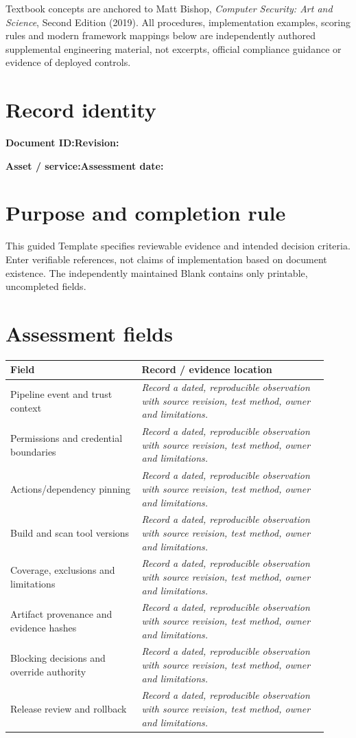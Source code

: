 \documentclass[10pt,letterpaper]{article}
\begin{document}
\makedoctocpage
\begin{notebox}
Textbook concepts are anchored to Matt Bishop, \emph{Computer Security: Art and Science}, Second Edition (2019). All procedures, implementation examples, scoring rules and modern framework mappings below are independently authored supplemental engineering material, not excerpts, official compliance guidance or evidence of deployed controls.
\end{notebox}
\section{Record identity}
\textbf{Document ID:}\enspace\hrulefill\quad\textbf{Revision:}\enspace\hrulefill
\par\medskip\textbf{Asset / service:}\enspace\hrulefill\quad\textbf{Assessment date:}\enspace\hrulefill
\section{Purpose and completion rule}
This guided Template specifies reviewable evidence and intended decision criteria. Enter verifiable references, not claims of implementation based on document existence. The independently maintained Blank contains only printable, uncompleted fields.
\section{Assessment fields}
\renewcommand{\arraystretch}{1.8}
\begin{longtable}{@{}p{0.38\linewidth}p{0.54\linewidth}@{}}
\toprule\textbf{Field}&\textbf{Record / evidence location}\\\midrule\endhead
Pipeline event and trust context & \emph{Record a dated, reproducible observation with source revision, test method, owner and limitations.}\\\midrule
Permissions and credential boundaries & \emph{Record a dated, reproducible observation with source revision, test method, owner and limitations.}\\\midrule
Actions/dependency pinning & \emph{Record a dated, reproducible observation with source revision, test method, owner and limitations.}\\\midrule
Build and scan tool versions & \emph{Record a dated, reproducible observation with source revision, test method, owner and limitations.}\\\midrule
Coverage, exclusions and limitations & \emph{Record a dated, reproducible observation with source revision, test method, owner and limitations.}\\\midrule
Artifact provenance and evidence hashes & \emph{Record a dated, reproducible observation with source revision, test method, owner and limitations.}\\\midrule
Blocking decisions and override authority & \emph{Record a dated, reproducible observation with source revision, test method, owner and limitations.}\\\midrule
Release review and rollback & \emph{Record a dated, reproducible observation with source revision, test method, owner and limitations.}\\\midrule
\bottomrule\end{longtable}
\end{document}
